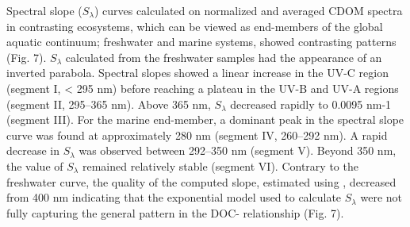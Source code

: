 Spectral slope ($S_\lambda$) curves calculated on normalized and averaged CDOM spectra in contrasting ecosystems, which can be viewed as end-members of the global aquatic continuum; freshwater and marine systems, showed contrasting patterns (Fig. 7). $S_\lambda$ calculated from the freshwater samples had the appearance of an inverted parabola. Spectral slopes showed a linear increase in the UV-C region (segment I, < 295 nm) before reaching a plateau in the UV-B and UV-A regions (segment II, 295--365 nm). Above 365 nm, $S_\lambda$ decreased rapidly to 0.0095 nm-1 (segment III). For the marine end-member, a dominant peak in the spectral slope curve was found at approximately 280 nm (segment IV, 260--292 nm). A rapid decrease in $S_\lambda$ was observed between 292--350 nm (segment V). Beyond 350 nm, the value of $S_\lambda$ remained relatively stable (segment VI). Contrary to the freshwater curve, the quality of the computed slope, estimated using \rr, decreased from 400 nm indicating that the exponential model used to calculate $S_\lambda$ were not fully capturing the general pattern in the DOC-\acdom{\lambda} relationship (Fig. 7).
